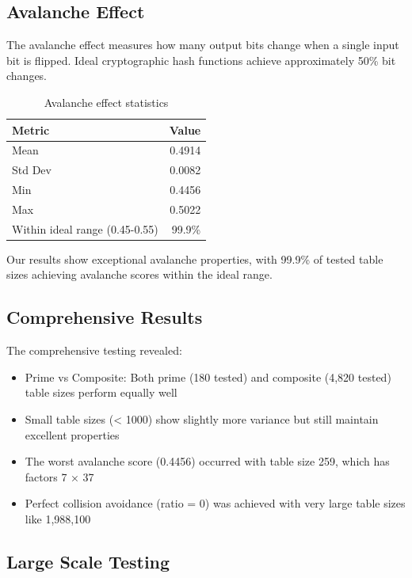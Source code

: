\documentclass[11pt,a4paper]{article}
\theoremstyle{definition}
\begin{document}
\subsection{Avalanche Effect}

The avalanche effect measures how many output bits change when a single input bit is flipped. Ideal cryptographic hash functions achieve approximately 50\% bit changes.

\begin{table}[h]
\centering
\caption{Avalanche effect statistics}
\begin{tabular}{@{}lr@{}}
\toprule
Metric & Value \\
\midrule
Mean & 0.4914 \\
Std Dev & 0.0082 \\
Min & 0.4456 \\
Max & 0.5022 \\
Within ideal range (0.45-0.55) & 99.9\% \\
\bottomrule
\end{tabular}
\end{table}

Our results show exceptional avalanche properties, with 99.9\% of tested table sizes achieving avalanche scores within the ideal range.

\subsection{Comprehensive Results}



The comprehensive testing revealed:
\begin{itemize}
\item Prime vs Composite: Both prime (180 tested) and composite (4,820 tested) table sizes perform equally well
\item Small table sizes (< 1000) show slightly more variance but still maintain excellent properties
\item The worst avalanche score (0.4456) occurred with table size 259, which has factors 7 × 37
\item Perfect collision avoidance (ratio = 0) was achieved with very large table sizes like 1,988,100
\end{itemize}

\subsection{Large Scale Testing}
\end{document}
